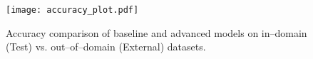 \begin{figure}[tb] %
\centering
\texttt{[image: accuracy\_plot.pdf]}  %
\caption{Accuracy comparison of baseline and advanced models on
in–domain (Test) vs. out–of–domain (External) datasets.}%
\label{fig:accuracy}
\end{figure}